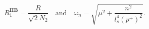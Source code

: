 \begin{equation}
R_1^{\mathbf{IIB}} = \frac{R}{\sqrt{2} N_2} \quad \textrm{and} \quad
\omega_n = \sqrt{\mu^2 + \frac{n^2}{l_s^4 (p^+)^2}}.
\end{equation}

